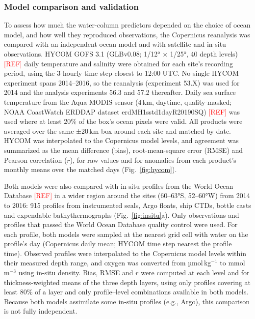\documentclass[11pt]{article}
\newcommand{\ins}[1]{\textcolor{red}{[#1]}}
\newcommand{\unit}[1]{\,#1}
\begin{document}
\subsubsection{Model comparison and validation}\label{sec:valid}
To assess how much the water-column predictors depended on the choice of ocean model, and how well they reproduced observations, the Copernicus reanalysis was compared with an independent ocean model and with satellite and in-situ observations. HYCOM GOFS 3.1 (GLBv0.08; 1/12° × 1/25°, 40 depth levels) \ins{REF} daily temperature and salinity were obtained for each site's recording period, using the 3-hourly time step closest to 12:00 UTC. No single HYCOM experiment spans 2014--2016, so the reanalysis (experiment 53.X) was used for 2014 and the analysis experiments 56.3 and 57.2 thereafter. Daily sea surface temperature from the Aqua MODIS sensor (4\unit{km}, daytime, quality-masked; NOAA CoastWatch ERDDAP dataset erdMH1sstd1dayR20190SQ) \ins{REF} was used where at least 20\% of the box's ocean pixels were valid. All products were averaged over the same ±20\unit{km} box around each site and matched by date. HYCOM was interpolated to the Copernicus model levels, and agreement was summarized as the mean difference (bias), root-mean-square error (RMSE) and Pearson correlation ($r$), for raw values and for anomalies from each product's monthly means over the matched days (Fig.~\ref{fig:hycom}).

Both models were also compared with in-situ profiles from the World Ocean Database \ins{REF} in a wider region around the sites (60--63°S, 52--60°W) from 2014 to 2016: 915 profiles from instrumented seals, Argo floats, ship CTDs, bottle casts and expendable bathythermographs (Fig.~\ref{fig:insitu}a). Only observations and profiles that passed the World Ocean Database quality control were used. For each profile, both models were sampled at the nearest grid cell with water on the profile's day (Copernicus daily mean; HYCOM time step nearest the profile time). Observed profiles were interpolated to the Copernicus model levels within their measured depth range, and oxygen was converted from µmol\unit{kg$^{-1}$} to mmol\unit{m$^{-3}$} using in-situ density. Bias, RMSE and $r$ were computed at each level and for thickness-weighted means of the three depth layers, using only profiles covering at least 80\% of a layer and only profile--level combinations available in both models. Because both models assimilate some in-situ profiles (e.g., Argo), this comparison is not fully independent.
\end{document}
